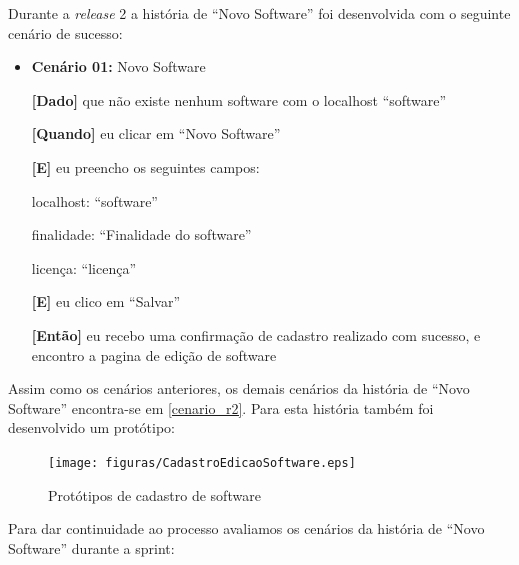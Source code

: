 Durante a \textit{release} 2 a história de ``Novo Software'' foi desenvolvida com o seguinte cenário de sucesso:

\begin{itemize}
\item\textbf{Cenário 01:} Novo Software

	\textbf{[Dado]} que não existe nenhum software com o localhost ``software''

	\textbf{[Quando]} eu clicar em ``Novo Software''

	\textbf{[E]} eu preencho os seguintes campos: 

  		\subitem localhost: ``software''

  		\subitem finalidade: ``Finalidade do software''

  		\subitem licença: ``licença''
  		
  		
	\textbf{[E]} eu clico em ``Salvar''

	\textbf{[Então]} eu recebo uma confirmação de cadastro realizado com sucesso, e encontro a pagina de edição de software
\end{itemize}
Assim como os cenários anteriores, os demais cenários da história de ``Novo Software'' encontra-se em \ref{cenario_r2}. Para esta história também foi desenvolvido um protótipo:

	\begin{figure}[h!]
    	\centering
    	\texttt{[image: figuras/CadastroEdicaoSoftware.eps]}
    	\caption{Protótipos de cadastro de software}
    	\label{cadastro software}
	\end{figure}


Para dar continuidade ao processo avaliamos os cenários da história de ``Novo Software'' durante a sprint: 

